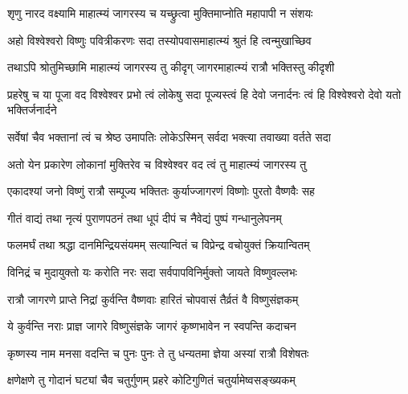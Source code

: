 \label{sec:padma-jagaranamahima}

\ganapatyadiDhyanam
\padmaPuranam



\twolineshloka
{शृणु नारद वक्ष्यामि माहात्म्यं जागरस्य च}
{यच्छ्रुत्वा मुक्तिमाप्नोति महापापी न संशयः}%


\twolineshloka
{अहो विश्वेश्वरो विष्णुः पवित्रीकरणः सदा}
{तस्योपवासमाहात्म्यं श्रुतं हि त्वन्मुखाच्छिव}%

\twolineshloka
{तथाऽपि श्रोतुमिच्छामि माहात्म्यं जागरस्य तु }
{कीदृग् जागरमाहात्म्यं रात्रौ भक्तिस्तु कीदृशी}%

\threelineshloka
{प्रहरेषु च या पूजा वद विश्वेश्वर प्रभो}
{त्वं लोकेषु सदा पूज्यस्त्वं हि देवो जनार्दनः}
{त्वं हि विश्वेश्वरो देवो यतो भक्तिर्जनार्दने}%

\twolineshloka
{सर्वेषां चैव भक्तानां त्वं च श्रेष्ठ उमापतिः}
{लोकेऽस्मिन् सर्वदा भक्त्या तवाख्या वर्तते सदा}%

\twolineshloka
{अतो येन प्रकारेण लोकानां मुक्तिरेव च}
{विश्वेश्वर वद त्वं तु माहात्म्यं जागरस्य तु}%


\twolineshloka
{एकादश्यां जनो विष्णुं रात्रौ सम्पूज्य भक्तितः}
{कुर्याज्जागरणं विष्णोः पुरतो वैष्णवैः सह}%

\twolineshloka
{गीतं वाद्यं तथा नृत्यं पुराणपठनं तथा}
{धूपं दीपं च नैवेद्यं पुष्पं गन्धानुलेपनम्}%

\twolineshloka
{फलमर्घं तथा श्रद्धा दानमिन्द्रियसंयमम्}
{सत्यान्वितं च विप्रेन्द्र वचोयुक्तं क्रियान्वितम्}%

\twolineshloka
{विनिद्रं च मुदायुक्तो यः करोति नरः सदा}
{सर्वपापविनिर्मुक्तो जायते विष्णुवल्लभः}%

\twolineshloka
{रात्रौ जागरणे प्राप्ते निद्रां कुर्वन्ति वैष्णवाः}
{हारितं चोपवासं तैर्व्रतं वै विष्णुसंज्ञकम्}%

\twolineshloka
{ये कुर्वन्ति नराः प्राज्ञ जागरे विष्णुसंज्ञके}
{जागरं कृष्णभावेन न स्वपन्ति कदाचन}%

\twolineshloka
{कृष्णस्य नाम मनसा वदन्ति च पुनः पुनः}
{ते तु धन्यतमा ज्ञेया अस्यां रात्रौ विशेषतः}%

\twolineshloka
{क्षणेक्षणे तु गोदानं घट्यां चैव चतुर्गुणम्}
{प्रहरे कोटिगुणितं चतुर्यामेष्वसङ्ख्यकम्}%

